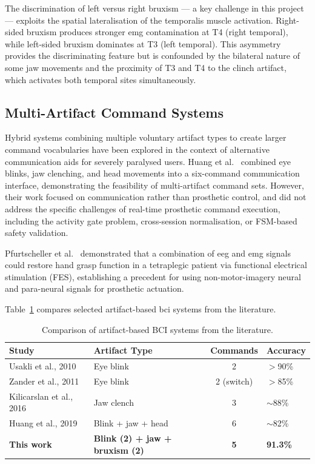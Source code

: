 The discrimination of left versus right bruxism — a key challenge
in this project — exploits the spatial lateralisation of the
temporalis muscle activation. Right-sided bruxism produces stronger
\acrshort{emg} contamination at T4 (right temporal), while
left-sided bruxism dominates at T3 (left temporal). This asymmetry
provides the discriminating feature but is confounded by the
bilateral nature of some jaw movements and the proximity of T3
and T4 to the clinch artifact, which activates both temporal
sites simultaneously.

\subsection{Multi-Artifact Command Systems}

Hybrid systems combining multiple voluntary artifact types to create
larger command vocabularies have been explored in the context of
alternative communication aids for severely paralysed users.
Huang et al.~\cite{huang2019hybrid} combined eye blinks, jaw
clenching, and head movements into a six-command communication
interface, demonstrating the feasibility of multi-artifact command
sets. However, their work focused on communication rather than
prosthetic control, and did not address the specific challenges
of real-time prosthetic command execution, including the activity
gate problem, cross-session normalisation, or FSM-based safety
validation.

Pfurtscheller et al.~\cite{pfurtscheller2003thought} demonstrated
that a combination of \acrshort{eeg} and \acrshort{emg} signals
could restore hand grasp function in a tetraplegic patient via
functional electrical stimulation (FES), establishing a precedent
for using non-motor-imagery neural and para-neural signals for
prosthetic actuation.

Table~\ref{tab:artifact_comparison} compares selected artifact-based
\acrshort{bci} systems from the literature.

\begin{table}[htbp]
\centering
\caption{Comparison of artifact-based BCI systems from the
literature.}
\label{tab:artifact_comparison}
\renewcommand{\arraystretch}{1.3}
\begin{tabular}{p{2.5cm} p{2.2cm} c p{2.5cm}}
\toprule
\textbf{Study} & \textbf{Artifact Type} & \textbf{Commands} &
\textbf{Accuracy} \\
\midrule
Usakli et al., 2010~\cite{usakli2010artifact}
    & Eye blink & 2 & $>$90\% \\
Zander et al., 2011~\cite{zander2011bci}
    & Eye blink & 2 (switch) & $>$85\% \\
Kilicarslan et al., 2016~\cite{kilicarslan2016high}
    & Jaw clench & 3 & $\sim$88\% \\
Huang et al., 2019~\cite{huang2019hybrid}
    & Blink + jaw + head & 6 & $\sim$82\% \\
\textbf{This work}
    & \textbf{Blink (2) + jaw + bruxism (2)}
    & \textbf{5} & \textbf{91.3\%} \\
\bottomrule
\end{tabular}
\end{table}

